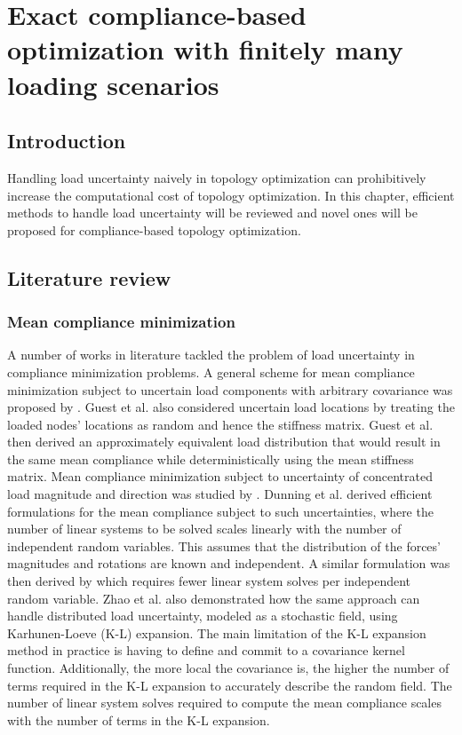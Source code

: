 \chapter{Exact compliance-based optimization with finitely many loading scenarios}\thispagestyle{EmptyHeader}
\label{chp:3}

\section{Introduction}

Handling load uncertainty naively in topology optimization can prohibitively increase the computational cost of topology optimization. In this chapter, efficient methods to handle load uncertainty will be reviewed and novel ones will be proposed for compliance-based topology optimization.

\section{Literature review}

  \subsection{Mean compliance minimization}

    A number of works in literature tackled the problem of load uncertainty in compliance minimization problems. A general scheme for mean compliance minimization subject to uncertain load components with arbitrary covariance was proposed by \cite{Guest2008}. Guest et al. also considered uncertain load locations by treating the loaded nodes' locations as random and hence the stiffness matrix. Guest et al. then derived an approximately equivalent load distribution that would result in the same mean compliance while deterministically using the mean stiffness matrix. Mean compliance minimization subject to uncertainty of concentrated load magnitude and direction was studied by \cite{Dunning2011}. Dunning et al. derived efficient formulations for the mean compliance subject to such uncertainties, where the number of linear systems to be solved scales linearly with the number of independent random variables. This assumes that the distribution of the forces' magnitudes and rotations are known and independent. A similar formulation was then derived by \cite{Zhao2014} which requires fewer linear system solves per independent random variable. Zhao et al. also demonstrated how the same approach can handle distributed load uncertainty, modeled as a stochastic field, using Karhunen-Loeve (K-L) expansion. The main limitation of the K-L expansion method in practice is having to define and commit to a covariance kernel function. Additionally, the more local the covariance is, the higher the number of terms required in the K-L expansion to accurately describe the random field. The number of linear system solves required to compute the mean compliance scales with the number of terms in the K-L expansion.

